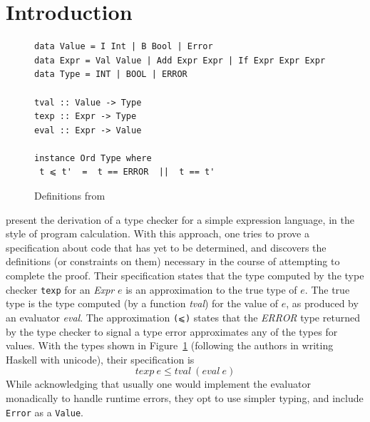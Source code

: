 \documentclass[acmsmall,screen,review]{acmart}
\begin{document}



\theoremstyle{definition}
\newtheorem{specification}[section]{Specification}

\maketitle

\section{Introduction}

\begin{figure}
\begin{verbatim}
data Value = I Int | B Bool | Error
data Expr = Val Value | Add Expr Expr | If Expr Expr Expr
data Type = INT | BOOL | ERROR

tval :: Value -> Type
texp :: Expr -> Type
eval :: Expr -> Value

instance Ord Type where
 t ⩽ t'  =  t == ERROR  ||  t == t'
\end{verbatim}
\caption{Definitions from \citet{garby+25}}
\label{fig:orig}
\end{figure}


\citet{garby+25} present the derivation of a type checker for a simple
expression language, in the style of program calculation.  With this
approach, one tries to prove a specification about code that has yet
to be determined, and discovers the definitions (or constraints on
them) necessary in the course of attempting to complete the proof.
Their specification states that the type computed by the type checker
\verb|texp| for an \textit{Expr} $e$ is an approximation to the true
type of $e$.  The true type is the type computed (by a function
\textit{tval}) for the value of $e$, as produced by an evaluator
\textit{eval}.  The approximation \verb|(⩽)| states that the
\textit{ERROR} type returned by the type checker to signal a type
error approximates any of the types for values.  With the types shown
in Figure~\ref{fig:orig} (following the authors in writing Haskell
with unicode), their specification is
\[
\textit{texp}\ e \le \textit{tval}\ (\textit{eval}\ e)
\]
\noindent While acknowledging that usually one would implement the
evaluator monadically to handle runtime errors, they opt to use
simpler typing, and include
\verb|Error| as a \verb|Value|.
\end{document}
